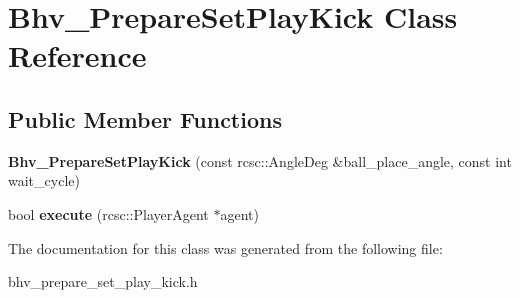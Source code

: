 \hypertarget{classBhv__PrepareSetPlayKick}{
\section{Bhv\_\-PrepareSetPlayKick Class Reference}
\label{classBhv__PrepareSetPlayKick}
}
\subsection*{Public Member Functions}
\begin{DoxyCompactItemize}
\item 
\hypertarget{classBhv__PrepareSetPlayKick_a892a04ca625e8ec69d913d3938dfff63}{
{\bfseries Bhv\_\-PrepareSetPlayKick} (const rcsc::AngleDeg \&ball\_\-place\_\-angle, const int wait\_\-cycle)}
\label{classBhv__PrepareSetPlayKick_a892a04ca625e8ec69d913d3938dfff63}

\item 
\hypertarget{classBhv__PrepareSetPlayKick_a173731d4a5de20cec25de372a1fcaa5e}{
bool {\bfseries execute} (rcsc::PlayerAgent $\ast$agent)}
\label{classBhv__PrepareSetPlayKick_a173731d4a5de20cec25de372a1fcaa5e}

\end{DoxyCompactItemize}


The documentation for this class was generated from the following file:\begin{DoxyCompactItemize}
\item 
bhv\_\-prepare\_\-set\_\-play\_\-kick.h\end{DoxyCompactItemize}
